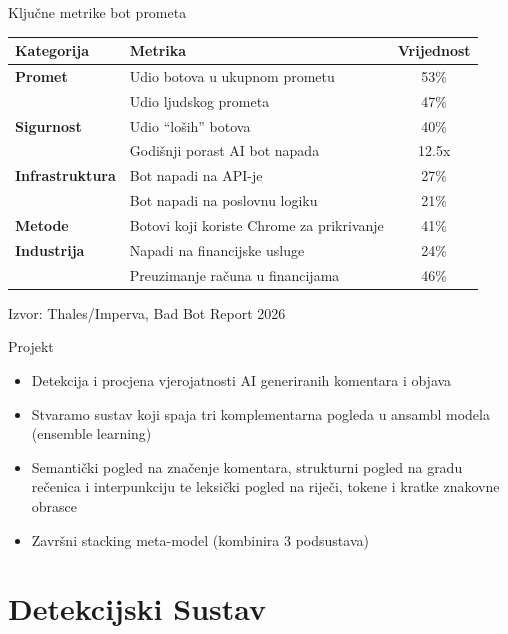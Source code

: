 \documentclass[aspectratio=169]{beamer}
\begin{document}
\begin{frame}{Ključne metrike bot prometa}
    \centering
    \small
    \begin{tabular}{@{}llc@{}}
        \toprule
        \textbf{Kategorija} & \textbf{Metrika} & \textbf{Vrijednost} \\ \midrule
        \textbf{Promet} & Udio botova u ukupnom prometu & 53\% \\
         & Udio ljudskog prometa & 47\% \\
        \textbf{Sigurnost} & Udio ``loših'' botova & 40\% \\
         & Godišnji porast AI bot napada & 12.5x \\
        \textbf{Infrastruktura} & Bot napadi na API-je & 27\% \\
         & Bot napadi na poslovnu logiku & 21\% \\
        \textbf{Metode} & Botovi koji koriste Chrome za prikrivanje & 41\% \\
        \textbf{Industrija} & Napadi na financijske usluge & 24\% \\
         & Preuzimanje računa u financijama & 46\% \\ \bottomrule
    \end{tabular}

    \vspace{2mm}
    {\tiny Izvor: Thales/Imperva, Bad Bot Report 2026}
\end{frame}


\begin{frame}{Projekt}
    \begin{itemize}
        \item  Detekcija i procjena vjerojatnosti AI generiranih komentara i objava
        \item Stvaramo sustav koji spaja tri komplementarna pogleda u ansambl modela (ensemble learning)
        \item Semantički pogled na značenje komentara, strukturni pogled na gradu rečenica i interpunkciju te
leksički pogled na riječi, tokene i kratke znakovne obrasce
        \item Završni stacking meta-model (kombinira 3 podsustava)
    \end{itemize}
\end{frame}

\section{Detekcijski Sustav}
\end{document}
